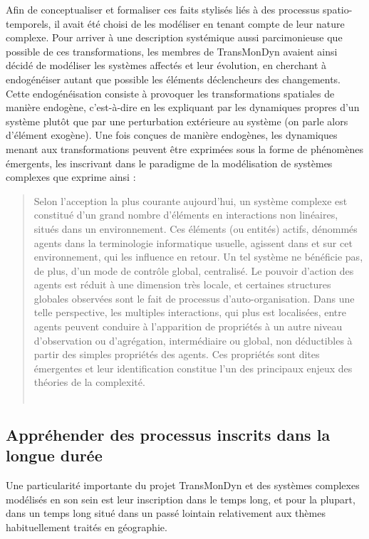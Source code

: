 Afin de conceptualiser et formaliser ces faits stylisés liés à des processus spatio-temporels, il avait été choisi de les modéliser en tenant compte de leur nature complexe.
Pour arriver à une description systémique aussi parcimonieuse que possible de ces transformations, les membres de TransMonDyn avaient ainsi décidé de modéliser les systèmes affectés et leur évolution, en cherchant à \og endogénéiser\fg{} autant que possible les éléments déclencheurs des changements.
Cette endogénéisation consiste à provoquer les transformations spatiales de manière endogène, c'est-à-dire en les expliquant par les dynamiques propres d'un système plutôt que par une perturbation extérieure au système (on parle alors d'élément exogène).
Une fois conçues de manière endogènes, les dynamiques menant aux transformations peuvent être exprimées sous la forme de phénomènes émergents, les inscrivant dans le paradigme de la modélisation de systèmes complexes que  exprime ainsi :
\begin{quotation}
\noindent \og Selon l'acception la plus courante aujourd'hui, un système complexe est constitué d'un grand nombre d'éléments en interactions non linéaires, situés dans un environnement.
Ces éléments (ou entités) actifs, dénommés agents dans la terminologie informatique usuelle, agissent dans et sur cet environnement, qui les influence en retour.
Un tel système ne bénéficie pas, de plus, d'un mode de contrôle global, centralisé.
Le pouvoir d'action des agents est réduit à une dimension très locale, et certaines structures globales observées sont le fait de processus d'auto-­organisation.
Dans une telle perspective, les multiples interactions, qui plus est localisées, entre agents peuvent conduire à l'apparition de propriétés à un autre niveau d'observation ou d'agrégation, intermédiaire ou global, non déductibles à partir des simples propriétés des agents.
Ces propriétés sont dites émergentes et leur identification constitue l'un des principaux enjeux des théories de la complexité. 
\fg{}\\
\mbox{}~ \hfill \cite[39-40]{banos_pour_2013}
\end{quotation}

\subsection{Appréhender des processus inscrits dans la longue durée \label{subsec:processus-longue-duree}}

Une particularité importante du projet TransMonDyn et des systèmes complexes modélisés en son sein est leur inscription dans le temps long, et pour la plupart, dans un temps long situé dans un passé lointain relativement aux thèmes habituellement traités en géographie.

